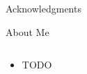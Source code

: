 \documentclass[final,hyperref={pdfpagelabels=false}]{beamer}
\begin{document}
\begin{frame}[t]
\begin{columns}[t]
\begin{column}{.465\textwidth}
\begin{block}{Acknowledgments}
\end{block}



\begin{block}{About Me}

\begin{columns} %

\begin{column}{.65\textwidth} %
\begin{itemize}
\item TODO
\end{itemize}
\end{column}


\end{columns}
\end{block}
\end{column}
\end{columns}
\end{frame}
\end{document}
